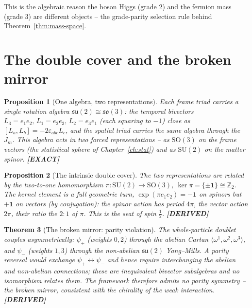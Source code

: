 \documentclass[11pt,oneside]{book}
\newcommand{\Zt}{\mathbb{Z}_2}
\newcommand{\su}{\mathfrak{su}}
\newcommand{\so}{\mathfrak{so}}
\newcommand{\status}[1]{{\sffamily\bfseries\color{statuscol}[#1]}}
\theoremstyle{plain}
\newtheorem{theorem}{Theorem}[chapter]
\newtheorem{proposition}[theorem]{Proposition}
\theoremstyle{definition}
\theoremstyle{remark}
\begin{document}
This is the algebraic reason the boson Higgs (grade $2$) and the fermion mass
(grade $3$) are different objects -- the grade-parity selection rule behind
Theorem~\ref{thm:mass-space}.

\section{The double cover and the broken mirror}
\label{sec:broken-mirror}

\begin{proposition}[One algebra, two representations]
\label{prop:two-reps}
Each frame triad carries a single rotation algebra $\su(2)\cong\so(3)$: the temporal
bivectors $L_3=e_1e_2,\,L_1=e_2e_3,\,L_2=e_3e_1$ (each squaring to $-1$) close as
$[L_a,L_b]=-2\varepsilon_{abc}L_c$, and the spatial triad carries the same algebra
through the $J_m$. This algebra acts in two forced representations -- as
$\mathrm{SO}(3)$ on the frame vectors (the statistical sphere of
Chapter~\ref{ch:stat}) and as $\mathrm{SU}(2)$ on the matter spinor. \status{EXACT}
\end{proposition}

\begin{proposition}[The intrinsic double cover]
\label{prop:cover}
The two representations are related by the two-to-one homomorphism
$\pi:\mathrm{SU}(2)\to\mathrm{SO}(3)$, $\ker\pi=\{\pm\mathbf 1\}\cong\Zt$. The kernel
element is a full geometric turn, $\exp(\pi e_1e_2)=-\mathbf 1$ on spinors but
$+\mathbf 1$ on vectors (by conjugation): the spinor action has period $4\pi$, the
vector action $2\pi$, their ratio the $2{:}1$ of $\pi$. This is the seat of spin
$\tfrac12$. \status{DERIVED}
\end{proposition}

\begin{theorem}[The broken mirror: parity violation]
\label{thm:broken-mirror}
The whole-particle doublet couples asymmetrically: $\psi_+$ (weights $0,2$) through
the abelian Cartan $\langle\omega^1,\omega^2,\omega^3\rangle$, and $\psi_-$ (weights
$1,3$) through the non-abelian $\su(2)$ Yang--Mills. A parity reversal would exchange
$\psi_+\leftrightarrow\psi_-$ and hence require interchanging the abelian and
non-abelian connections; these are inequivalent bivector subalgebras and no
isomorphism relates them. The framework therefore admits \emph{no} parity symmetry --
the broken mirror, consistent with the chirality of the weak interaction.
\status{DERIVED}
\end{theorem}
\end{document}

